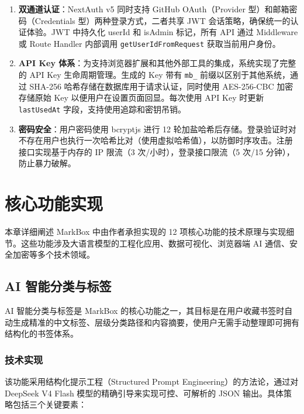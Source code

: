 \documentclass[12pt,a4paper]{ctexart}
\begin{document}
\begin{enumerate}
  \item \textbf{双通道认证}：NextAuth v5 同时支持 GitHub OAuth（Provider 型）和邮箱密码（Credentials 型）两种登录方式，二者共享 JWT 会话策略，确保统一的认证体验。JWT 中持久化 userId 和 isAdmin 标记，所有 API 通过 Middleware 或 Route Handler 内部调用 \texttt{getUserIdFromRequest} 获取当前用户身份。
  \item \textbf{API Key 体系}：为支持浏览器扩展和其他外部工具的集成，系统实现了完整的 API Key 生命周期管理。生成的 Key 带有 \texttt{mb\_} 前缀以区别于其他系统，通过 SHA-256 哈希存储在数据库用于请求认证，同时使用 AES-256-CBC 加密存储原始 Key 以便用户在设置页面回显。每次使用 API Key 时更新 \texttt{lastUsedAt} 字段，支持使用追踪和密钥吊销。
  \item \textbf{密码安全}：用户密码使用 bcryptjs 进行 12 轮加盐哈希后存储。登录验证时对不存在用户也执行一次哈希比对（使用虚拟哈希值），以防御时序攻击。注册接口实现基于内存的 IP 限流（3 次/小时），登录接口限流（5 次/15 分钟），防止暴力破解。
\end{enumerate}

\section{核心功能实现}
\label{sec:implementation}

本章详细阐述 MarkBox 中由作者承担实现的 12 项核心功能的技术原理与实现细节。这些功能涉及大语言模型的工程化应用、数据可视化、浏览器端 AI 通信、安全加密等多个技术领域。

\subsection{AI 智能分类与标签}

AI 智能分类与标签是 MarkBox 的核心功能之一，其目标是在用户收藏书签时自动生成精准的中文标签、层级分类路径和内容摘要，使用户无需手动整理即可拥有结构化的书签体系。

\subsubsection{技术实现}

该功能采用结构化提示工程（Structured Prompt Engineering）的方法论，通过对 DeepSeek V4 Flash 模型的精确引导来实现可控、可解析的 JSON 输出。具体策略包括三个关键要素：
\end{document}
